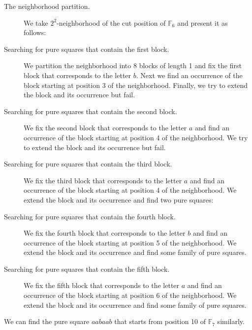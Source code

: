 \documentclass[11pt]{article}
\begin{document}
\begin{appendix}
\begin{itemize}
\begin{item}
    \begin{description}
    \item[The neighborhood partition.]
    We take $2^2$-neighborhood of the cut position of $\mathbb{F}_6$  and present it as follows:
    \end{description}
    \CurrentNeighborhoodPicture{}
    \begin{description}
    \item[Searching for pure squares that contain the first block.]
    We partition the neighborhood into 8 blocks of length 1 and fix the first block that corresponds to the letter
    $b$. Next we find an occurrence of the block starting at position 3 of the neighborhood. Finally, we try to extend
    the block and its occurrence but fail.
    \item[Searching for pure squares that contain the second block.]
    We fix the second block that corresponds to the letter $a$ and find an occurrence of the block starting at position 4
    of  the neighborhood. We try to extend the block and its occurrence but fail.
    \item[Searching for pure squares that contain the third block.]
    We fix the third block that corresponds to the letter $a$ and find an occurrence of the block starting at position 4 of the
    neighborhood. We extend the block and its occurrence and find two pure squares:
    \end{description}
    \BlocksExtensionPicture{}
    \begin{description}
    \item[Searching for pure squares that contain the fourth block.]
    We fix the fourth block that corresponds to the letter $b$ and find an occurrence of the block starting at position 5 of the
    neighborhood. We extend the block and its occurrence and find some family of pure squares.
    \item[Searching for pure squares that contain the fifth block.]
    We fix the fifth block that corresponds to the letter $a$ and find an occurrence of the block starting at position 6 of the
    neighborhood. We extend the block and its occurrence and find some family of pure squares.
        \end{description}
\end{item}
\begin{item}
We can find the pure square $aabaab$ that starts from position 10 of $\mathbb{F}_7$ similarly.
\end{item}
\end{itemize}


\end{appendix}
\end{document}
